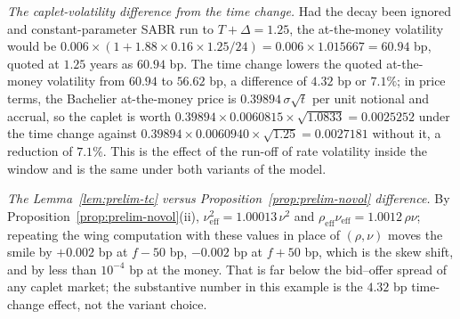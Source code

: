 \documentclass[../../../main.tex]{subfiles}
\begin{document}
\emph{The caplet-volatility difference from the time change.} Had the decay been ignored and constant-parameter SABR run to $T+\Delta=1.25$, the at-the-money volatility would be $0.006\times(1+1.88\times0.16\times1.25/24)=0.006\times1.015667=60.94$ bp, quoted at $1.25$ years as $60.94$ bp. The time change lowers the quoted at-the-money volatility from $60.94$ to $56.62$ bp, a difference of $4.32$ bp or $7.1\%$; in price terms, the Bachelier at-the-money price is $0.39894\,\sigma\sqrt t$ per unit notional and accrual, so the caplet is worth $0.39894\times0.0060815\times\sqrt{1.0833}=0.0025252$ under the time change against $0.39894\times0.0060940\times\sqrt{1.25}=0.0027181$ without it, a reduction of $7.1\%$. This is the effect of the run-off of rate volatility inside the window and is the same under both variants of the model.

\emph{The Lemma~\ref{lem:prelim-tc} versus Proposition~\ref{prop:prelim-novol} difference.} By Proposition~\ref{prop:prelim-novol}(ii), $\nu_{\mathrm{eff}}^2=1.00013\,\nu^2$ and $\rho_{\mathrm{eff}}\nu_{\mathrm{eff}}=1.0012\,\rho\nu$; repeating the wing computation with these values in place of $(\rho,\nu)$ moves the smile by $+0.002$ bp at $f-50$ bp, $-0.002$ bp at $f+50$ bp, which is the skew shift, and by less than $10^{-4}$ bp at the money. That is far below the bid--offer spread of any caplet market; the substantive number in this example is the $4.32$ bp time-change effect, not the variant choice.


\end{document}
